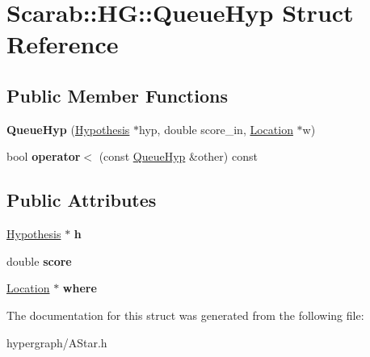 \hypertarget{structScarab_1_1HG_1_1QueueHyp}{
\section{Scarab::HG::QueueHyp Struct Reference}
\label{structScarab_1_1HG_1_1QueueHyp}
}
\subsection*{Public Member Functions}
\begin{DoxyCompactItemize}
\item 
\hypertarget{structScarab_1_1HG_1_1QueueHyp_a165e60736b23d97bec8cdaff7c742db7}{
{\bfseries QueueHyp} (\hyperlink{structScarab_1_1HG_1_1Hypothesis}{Hypothesis} $\ast$hyp, double score\_\-in, \hyperlink{structScarab_1_1HG_1_1Location}{Location} $\ast$w)}
\label{structScarab_1_1HG_1_1QueueHyp_a165e60736b23d97bec8cdaff7c742db7}

\item 
\hypertarget{structScarab_1_1HG_1_1QueueHyp_aa02f7835d0dd0d00cc5f00ff7430ddf3}{
bool {\bfseries operator$<$} (const \hyperlink{structScarab_1_1HG_1_1QueueHyp}{QueueHyp} \&other) const }
\label{structScarab_1_1HG_1_1QueueHyp_aa02f7835d0dd0d00cc5f00ff7430ddf3}

\end{DoxyCompactItemize}
\subsection*{Public Attributes}
\begin{DoxyCompactItemize}
\item 
\hypertarget{structScarab_1_1HG_1_1QueueHyp_ae3368ba62dae4842a83766b44bcda346}{
\hyperlink{structScarab_1_1HG_1_1Hypothesis}{Hypothesis} $\ast$ {\bfseries h}}
\label{structScarab_1_1HG_1_1QueueHyp_ae3368ba62dae4842a83766b44bcda346}

\item 
\hypertarget{structScarab_1_1HG_1_1QueueHyp_ab4c4483fa92ecb415def41f5ed366e53}{
double {\bfseries score}}
\label{structScarab_1_1HG_1_1QueueHyp_ab4c4483fa92ecb415def41f5ed366e53}

\item 
\hypertarget{structScarab_1_1HG_1_1QueueHyp_ae151535de5fa3bb2cfe44dade082c613}{
\hyperlink{structScarab_1_1HG_1_1Location}{Location} $\ast$ {\bfseries where}}
\label{structScarab_1_1HG_1_1QueueHyp_ae151535de5fa3bb2cfe44dade082c613}

\end{DoxyCompactItemize}


The documentation for this struct was generated from the following file:\begin{DoxyCompactItemize}
\item 
hypergraph/AStar.h\end{DoxyCompactItemize}
